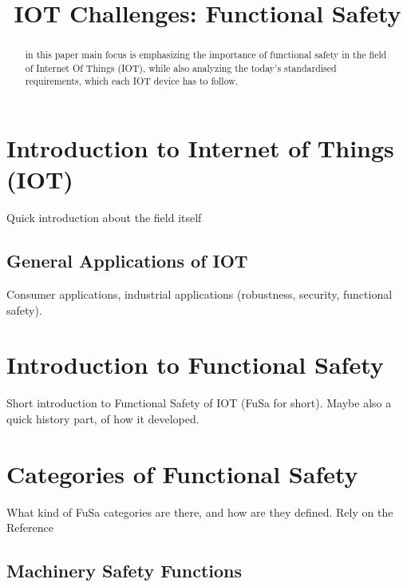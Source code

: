 \documentclass[conference]{IEEEtran}
\begin{document}
\title{IOT Challenges: Functional Safety}

\author{
}

\maketitle

\begin{abstract}
in this paper main focus is emphasizing the importance of functional safety in the field of Internet Of Things (IOT), while also analyzing the today's standardised requirements, which each IOT device has to follow.
\end{abstract}

\thispagestyle{firstpagefooter}

\section{Introduction to Internet of Things (IOT)}

Quick introduction about the field itself

\subsection{General Applications of IOT}

Consumer applications, industrial applications (robustness, security, functional safety).

\section{Introduction to Functional Safety}
Short introduction to Functional Safety of IOT (FuSa for short). Maybe also a quick history part, of how it developed.

\section{Categories of Functional Safety}
What kind of FuSa categories are there, and how are they defined. Rely on the Reference \cite{robinson_living_2019}
\subsection{Machinery Safety Functions}
\end{document}
